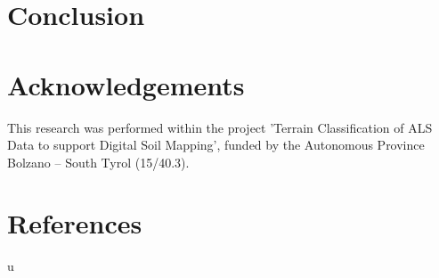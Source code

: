 \documentclass[preprint,12pt,authoryear]{elsarticle}
\begin{document}
\section{Conclusion}
 

\section*{Acknowledgements} This research was performed within the project 'Terrain Classification of ALS Data to support Digital Soil Mapping', funded by the Autonomous Province Bolzano -- South Tyrol (15/40.3).

\section*{References}
u
\end{document}
